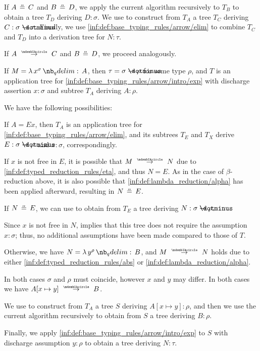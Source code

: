 \begin{algorithm}
\begin{thmenum}
\begin{thmenum}
      If \( A \aequiv C \) and \( B \aequiv D \), we apply the current algorithm recursively to \( T_B \) to obtain a tree \( T_D \) deriving \( D: \sigma \). We use  to construct from \( T_A \) a tree \( T_C \) deriving \( C: \sigma \synimplies \tau \). Finally, we use \ref{inf:def:base_typing_rules/arrow/elim} to combine \( T_C \) and \( T_D \) into a derivation tree for \( N: \tau \).

      If \( A \pred C \) and \( B \aequiv D \), we proceed analogously.
    \end{thmenum}

     If \( M = \qabs {x^\sigma} A \), then \( \tau = \sigma \synimplies \rho \) for some type \( \rho \), and \( T \) is an application tree for \ref{inf:def:base_typing_rules/arrow/intro/exp} with discharge assertion \( x: \sigma \) and subtree \( T_A \) deriving \( A: \rho \).

    We have the following possibilities:
    \begin{thmenum}
       If \( A = Ex \), then \( T_A \) is an application tree for \ref{inf:def:base_typing_rules/arrow/elim}, and its subtrees \( T_E \) and \( T_X \) derive \( E: \sigma \synimplies \rho \) and \( x: \sigma \), correspondingly.

      If \( x \) is not free in \( E \), it is possible that \( M \pred N \) due to \ref{inf:def:typed_reduction_rules/eta}, and thus \( N = E \). As in the case of \( \beta \)-reduction above, it is also possible that \ref{inf:def:lambda_reduction/alpha} has been applied afterward, resulting in \( N \aequiv E \).

      If \( N \aequiv E \), we can use  to obtain from \( T_E \) a tree deriving \( N: \sigma \synimplies \rho \).

      Since \( x \) is not free in \( N \),  implies that this tree does not require the assumption \( x: \sigma \); thus, no additional assumptions have been made compared to those of \( T \).

       Otherwise, we have \( N = \qabs {y^\rho} B \), and \( M \pred N \) holds due to either \ref{inf:def:typed_reduction_rules/abs} or \ref{inf:def:lambda_reduction/alpha}.

      In both cases \( \sigma \) and \( \rho \) must coincide, however \( x \) and \( y \) may differ. In both cases we have \( A[x \mapsto y] \pred B \).

      We use  to construct from \( T_A \) a tree \( S \) deriving \( A[x \mapsto y]: \rho \), and then we use the current algorithm recursively to obtain from \( S \) a tree deriving \( B: \rho \).

      Finally, we apply  \ref{inf:def:base_typing_rules/arrow/intro/exp} to \( S \) with discharge assumption \( y: \rho \) to obtain a tree deriving \( N: \tau \).
    \end{thmenum}
  \end{thmenum}
\end{algorithm}
